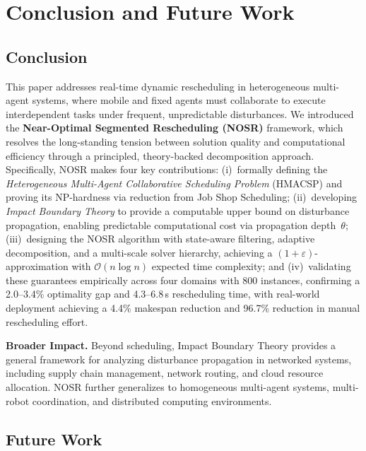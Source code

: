 \documentclass[manuscript,screen,review]{acmart}
\begin{document}
\section{Conclusion and Future Work}
\label{sec:conclusion_future}
\subsection{Conclusion}
\label{sec:conclusion}

This paper addresses real-time dynamic rescheduling in heterogeneous
multi-agent systems, where mobile and fixed agents must collaborate to
execute interdependent tasks under frequent, unpredictable disturbances.
We introduced the \textbf{Near-Optimal Segmented Rescheduling (NOSR)}
framework, which resolves the long-standing tension between solution
quality and computational efficiency through a principled,
theory-backed decomposition approach. Specifically, NOSR makes four
key contributions: (i)~formally defining the \textit{Heterogeneous
Multi-Agent Collaborative Scheduling Problem} (HMACSP) and proving its
NP-hardness via reduction from Job Shop Scheduling; (ii)~developing
\textit{Impact Boundary Theory} to provide a computable upper bound on
disturbance propagation, enabling predictable computational cost via
propagation depth~$\theta$; (iii)~designing the NOSR algorithm with
state-aware filtering, adaptive decomposition, and a multi-scale solver
hierarchy, achieving a $(1+\varepsilon)$-approximation with
$\mathcal{O}(n \log n)$ expected time complexity; and (iv)~validating
these guarantees empirically across four domains with 800 instances,
confirming a 2.0--3.4\% optimality gap and 4.3--6.8\,s rescheduling
time, with real-world deployment achieving a 4.4\% makespan reduction
and 96.7\% reduction in manual rescheduling effort.

\medskip\noindent\textbf{Broader Impact.}
Beyond scheduling, Impact Boundary Theory provides a general framework
for analyzing disturbance propagation in networked systems, including
supply chain management, network routing, and cloud resource allocation.
NOSR further generalizes to homogeneous multi-agent systems, multi-robot
coordination, and distributed computing environments.

\subsection{Future Work}
\label{sec:future_work}
\end{document}
